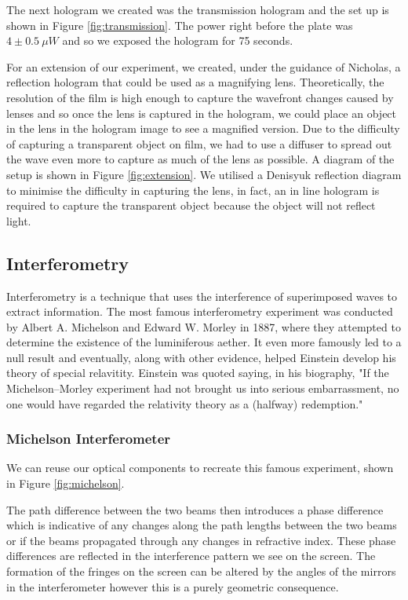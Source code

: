 \documentclass[aps,prl,reprint,10pt,amsmath,amssymb,superscriptaddress,a4paper]{revtex4-2}
\begin{document}
The next hologram we created was the transmission hologram and the set up is shown in Figure \ref{fig:transmission}. The power right before the plate was $4 \pm 0.5 \: \mu W$ and so we exposed the 
hologram for 75 seconds.

For an extension of our experiment, we created, under the guidance of Nicholas, a reflection hologram that could be used as a magnifying lens. Theoretically, the resolution of the film is high enough to 
capture the wavefront changes caused by lenses and so once the lens is captured in the hologram, we could place an object in the lens in the hologram image to see a magnified version. Due to the difficulty 
of capturing a transparent object on film, we had to use a diffuser to spread out the wave even more to capture as much of the lens as possible. A diagram of the setup is shown in Figure \ref{fig:extension}.
We utilised a Denisyuk reflection diagram to minimise the difficulty in capturing the lens, in fact, an in line hologram is required to capture the transparent object because the object will not reflect light.


\subsection{Interferometry}
Interferometry is a technique that uses the interference of superimposed waves to extract information. The most famous interferometry experiment was conducted by Albert A. Michelson and Edward W. Morley in 1887, where they attempted to determine 
the existence of the luminiferous aether. It even more famously led to a null result \citep{michelson} and eventually, along with other evidence, helped Einstein develop his theory of special relavitity. Einstein was quoted saying, in his biography, "If the Michelson–Morley 
experiment had not brought us into serious embarrassment, no one would have regarded the relativity theory as a (halfway) redemption." \cite{folsing}

\subsubsection{Michelson Interferometer}
We can reuse our optical components to recreate this famous experiment, shown in Figure \ref{fig:michelson}.

The path difference between the two beams then introduces a phase difference which is indicative of any changes along the path lengths between the two beams or if the beams propagated through any changes in refractive index. These phase differences are reflected in the interference 
pattern we see on the screen. The formation of the fringes on the screen can be altered by the angles of the mirrors in the interferometer however this is a purely geometric consequence.
\end{document}
